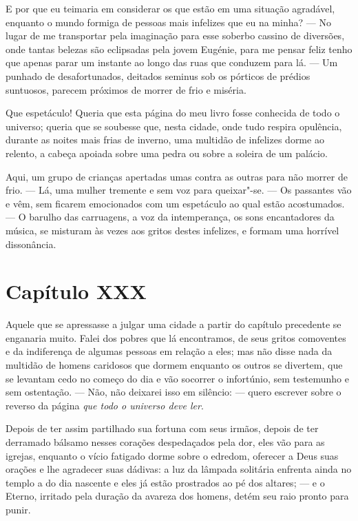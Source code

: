  E por que eu teimaria em considerar os que estão em uma situação
agradável, enquanto o mundo formiga de pessoas mais infelizes que eu na
minha? --- No lugar de me transportar pela imaginação para esse soberbo
cassino de diversões, onde tantas belezas são eclipsadas pela jovem
Eugénie, para me pensar feliz tenho que apenas parar um instante ao
longo das ruas que conduzem para lá. --- Um punhado de desafortunados,
deitados seminus sob os pórticos de prédios suntuosos, parecem
próximos de morrer de frio e miséria.

 Que espetáculo! Queria que esta página do meu livro fosse conhecida de
todo o universo; queria que se soubesse que, nesta cidade, onde tudo
respira opulência, durante as noites mais frias de inverno, uma
multidão de infelizes dorme ao relento, a cabeça apoiada sobre uma
pedra ou sobre a soleira de um palácio.

 Aqui, um grupo de crianças apertadas umas contra as outras para não
morrer de frio. --- Lá, uma mulher tremente e sem voz para queixar"-se.
--- Os passantes vão e vêm, sem ficarem emocionados com um espetáculo
ao qual estão acostumados. --- O barulho das carruagens, a voz da
intemperança, os sons encantadores da música, se misturam às vezes aos
gritos destes infelizes, e formam uma horrível dissonância.

\section*{Capítulo XXX}

 Aquele que se apressasse a julgar uma cidade a partir do capítulo
precedente se enganaria muito. Falei dos pobres que lá encontramos, de
seus gritos comoventes e da indiferença de algumas pessoas em relação a
eles; mas não disse nada da multidão de homens caridosos que dormem
enquanto os outros se divertem, que se levantam cedo no começo do dia e
vão socorrer o infortúnio, sem testemunho e sem ostentação. --- Não,
não deixarei isso em silêncio: --- quero escrever sobre o reverso da
página \textit{que todo o universo deve ler}.

 Depois de ter assim partilhado sua fortuna com seus irmãos, depois de
ter derramado bálsamo nesses corações despedaçados pela dor, eles vão
para as igrejas, enquanto o vício fatigado dorme sobre o edredom,
oferecer a Deus suas orações e lhe agradecer suas dádivas: a luz da
lâmpada solitária enfrenta ainda no templo a do dia nascente e eles já
estão prostrados ao pé dos altares; --- e o Eterno, irritado pela
duração da avareza dos homens, detém seu raio pronto para punir.

